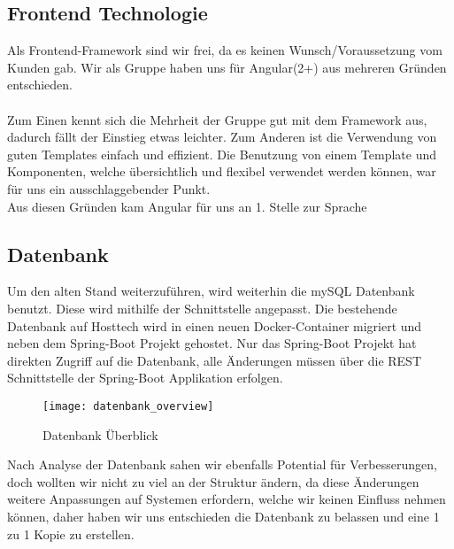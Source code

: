 \documentclass[../main.tex]{subfiles}
\begin{document}
	\subsection{Frontend Technologie}
	Als Frontend-Framework sind wir frei, da es keinen Wunsch/Voraussetzung vom Kunden gab.
	Wir als Gruppe haben uns für Angular(2+) aus mehreren Gründen entschieden. \\
	\\
	Zum Einen kennt sich die Mehrheit der Gruppe gut mit dem Framework aus, dadurch fällt der Einstieg etwas leichter. Zum Anderen ist die Verwendung von guten Templates einfach und effizient. Die Benutzung von einem Template und Komponenten, welche übersichtlich und flexibel verwendet werden können, war für uns ein ausschlaggebender Punkt. \\ 
	Aus diesen Gründen kam Angular für uns an 1. Stelle zur Sprache
	
	
	\subsection{Datenbank}
	Um den alten Stand weiterzuführen, wird weiterhin die mySQL Datenbank benutzt. Diese wird mithilfe der Schnittstelle angepasst.
	Die bestehende Datenbank auf Hosttech wird in einen neuen Docker-Container migriert und neben dem Spring-Boot Projekt gehostet. Nur das Spring-Boot Projekt hat direkten Zugriff auf die Datenbank, alle Änderungen müssen über die REST Schnittstelle der Spring-Boot Applikation erfolgen.
	
	\begin{figure}[H]
		\centering
		\texttt{[image: datenbank\_overview]}
		\caption{Datenbank Überblick}
		\label{fig:datenbank_overview}
	\end{figure}
	\par
	\noindent
	Nach Analyse der Datenbank sahen wir ebenfalls Potential für Verbesserungen, doch wollten wir nicht zu viel an der Struktur ändern, da diese Änderungen weitere Anpassungen auf Systemen erfordern, welche wir keinen Einfluss nehmen können, daher haben wir uns entschieden die Datenbank zu belassen und eine 1 zu 1 Kopie zu erstellen.
\end{document}
